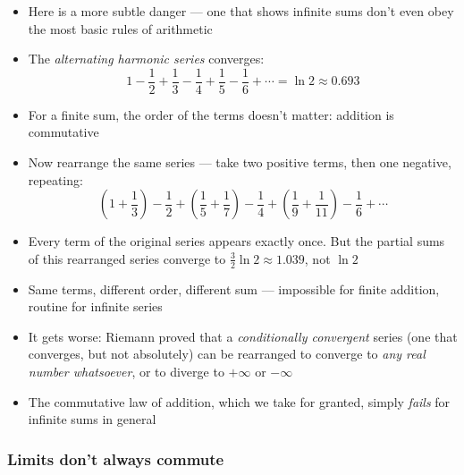 \documentclass[
  10pt,
  letterpaper,
]{scrbook}
\providecommand{\tightlist}{%
  \setlength{\itemsep}{0pt}\setlength{\parskip}{0pt}}
\begin{document}
\begin{itemize}
\tightlist
\item
  Here is a more subtle danger --- one that shows infinite sums don't
  even obey the most basic rules of arithmetic
\item
  The \emph{alternating harmonic series} converges:
  \[1 - \frac{1}{2} + \frac{1}{3} - \frac{1}{4} + \frac{1}{5} - \frac{1}{6} + \cdots = \ln 2 \approx 0.693\]
\item
  For a finite sum, the order of the terms doesn't matter: addition is
  commutative
\item
  Now rearrange the same series --- take two positive terms, then one
  negative, repeating:
  \[\left(1 + \frac{1}{3}\right) - \frac{1}{2} + \left(\frac{1}{5} + \frac{1}{7}\right) - \frac{1}{4} + \left(\frac{1}{9} + \frac{1}{11}\right) - \frac{1}{6} + \cdots\]
\item
  Every term of the original series appears exactly once. But the
  partial sums of this rearranged series converge to
  \(\frac{3}{2}\ln 2 \approx 1.039\), not \(\ln 2\)
\item
  Same terms, different order, different sum --- impossible for finite
  addition, routine for infinite series
\item
  It gets worse: Riemann proved that a \emph{conditionally convergent}
  series (one that converges, but not absolutely) can be rearranged to
  converge to \emph{any real number whatsoever}, or to diverge to
  \(+\infty\) or \(-\infty\)
\item
  The commutative law of addition, which we take for granted, simply
  \emph{fails} for infinite sums in general
\end{itemize}

\subsubsection*{Limits don't always
commute}\label{limits-dont-always-commute}
\end{document}

